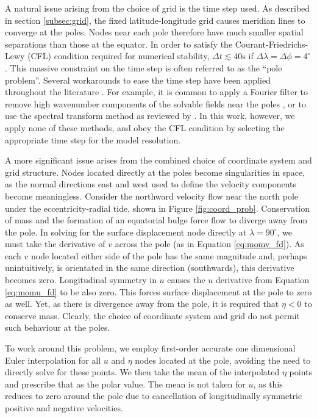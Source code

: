A natural issue arising from the choice of grid is the time step used. As described in section \ref{subsec:grid}, the fixed latitude-longitude grid causes meridian lines to converge at the poles. Nodes near each pole therefore have much smaller spatial separations than those at the equator. In order to satisfy the Courant-Friedrichs-Lewy (CFL) condition required for numerical stability, $\Delta t \lesssim 40 \si{\second}$ if $\Delta \lambda = \Delta \phi = 4^{\circ}$ \citep{arakawa1977computational,sears1995tidal}. This massive constraint on the time step is often referred to as the ``pole problem''. Several workarounds to ease the time step have been applied throughout the literature \citep{comblen2009finite}. For example, it is common to apply a Fourier filter to remove high wavenumber components of the solvable fields near the poles \citep{murray2002fourier}, or to use the spectral transform method as reviewed by \citet{swarztrauber1996spectral}. In this work, however, we apply none of these methods, and obey the CFL condition by selecting the appropriate time step for the model resolution.

A more significant issue arises from the combined choice of coordinate system and grid structure. Nodes located directly at the poles become singularities in space, as the normal directions east and west used to define the velocity components become meaningless. Consider the northward velocity flow near the north pole under the eccentricity-radial tide, shown in Figure \ref{fig:coord_prob}. Conservation of mass and the formation of an equatorial bulge force flow to diverge away from the pole. In solving for the surface displacement node directly at $\lambda = 90^{\circ}$, we must take the derivative of $v$ across the pole (as in Equation \ref{eq:momv_fd}). As each $v$ node located either side of the pole has the same magnitude and, perhaps unintuitively, is orientated in the same direction (southwards), this derivative becomes zero. Longitudinal symmetry in $u$ causes the $u$ derivative from Equation \ref{eq:momu_fd} to be also zero. This forces surface displacement at the pole to zero as well. Yet, as there is divergence away from the pole, it is required that $\eta < 0$ to conserve mass. Clearly, the choice of coordinate system and grid do not permit such behaviour at the poles. 

To work around this problem, we employ first-order accurate one dimensional Euler interpolation for all $u$ and $\eta$ nodes located at the pole, avoiding the need to directly solve for these points. We then take the mean of the interpolated $\eta$ points and prescribe that as the polar value. The mean is not taken for $u$, as this reduces to zero around the pole due to cancellation of longitudinally symmetric positive and negative velocities.

